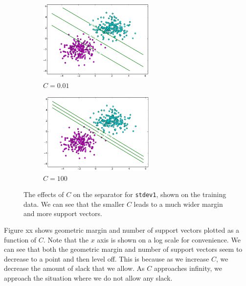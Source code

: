 \documentclass{sigchi}
\begin{document}
\begin{figure}
\centering

\begin{subfigure}[b]{2.25in}
	\includegraphics[width = 2.25in]{plots/varyingC/001.png}
	\caption{$C = 0.01$}
\end{subfigure}

\begin{subfigure}[b]{2.25in}
	\includegraphics[width = 2.25in]{plots/varyingC/100.png}
	\caption{$C = 100$}
\end{subfigure}
\caption{The effects of $C$ on the separator for \texttt{stdev1}, shown on the training data. We can see that the smaller $C$ leads to a much wider margin and more support vectors.}
\end{figure}

Figure xx shows geometric margin and number of support vectors plotted as a function of $C$. Note that the $x$ axis is shown on a log scale for convenience. We can see that both the geometric margin and number of support vectors seem to decrease to a point and then level off. This is because as we increase $C$, we decrease the amount of slack that we allow. As $C$ approaches infinity, we approach the situation where we do not allow any slack.
\end{document}
